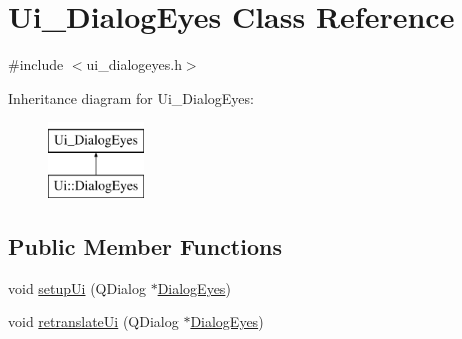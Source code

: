 \hypertarget{class_ui___dialog_eyes}{}\section{Ui\+\_\+\+Dialog\+Eyes Class Reference}
\label{class_ui___dialog_eyes}


{\ttfamily \#include $<$ui\+\_\+dialogeyes.\+h$>$}

Inheritance diagram for Ui\+\_\+\+Dialog\+Eyes\+:\begin{figure}[H]
\begin{center}
\leavevmode
\includegraphics[height=2.000000cm]{class_ui___dialog_eyes}
\end{center}
\end{figure}
\subsection*{Public Member Functions}
\begin{DoxyCompactItemize}
\item 
void \hyperlink{class_ui___dialog_eyes_a51ce884bcab7ca170ca7b45f25dd93be}{setup\+Ui} (Q\+Dialog $\ast$\hyperlink{class_dialog_eyes}{Dialog\+Eyes})
\item 
void \hyperlink{class_ui___dialog_eyes_ac241c0d82e58ce5044e0a76debc206b3}{retranslate\+Ui} (Q\+Dialog $\ast$\hyperlink{class_dialog_eyes}{Dialog\+Eyes})
\end{DoxyCompactItemize}
